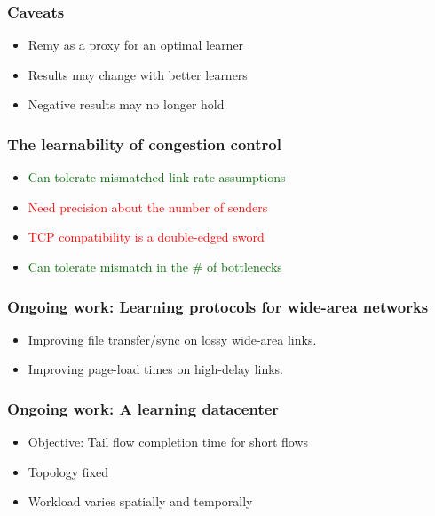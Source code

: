 \documentclass[svgnames]{beamer}
\begin{document}
\begin{Large}






 



\begin{frame}
\frametitle{Caveats}
\begin{itemize}
\item<2-> Remy as a proxy for an optimal learner
\item<3-> Results may change with better learners
\item<4-> Negative results may no longer hold
\end{itemize}
\end{frame}

\begin{frame}
\frametitle{The learnability of congestion control}
\noindent
\begin{itemize}
\item<2-> \textcolor{darkgreen}{Can tolerate mismatched link-rate assumptions}
\item<3-> \textcolor{red}{Need precision about the number of senders}
\item<4-> \textcolor{red}{TCP compatibility is a double-edged sword}
\item<5-> \textcolor{darkgreen}{Can tolerate mismatch in the \# of bottlenecks}
\end{itemize}
\end{frame}

\begin{frame}
\frametitle{Ongoing work: Learning protocols for wide-area networks}
\begin{itemize}
\item Improving file transfer/sync on lossy wide-area links.
\item Improving page-load times on high-delay links. 
\end{itemize}
\end{frame}

\begin{frame}
\frametitle{Ongoing work: A learning datacenter}
\begin{itemize}
\item Objective: Tail flow completion time for short flows
\item Topology fixed
\item Workload varies spatially and temporally
\end{itemize}
\end{frame}


\end{Large}
\end{document}
